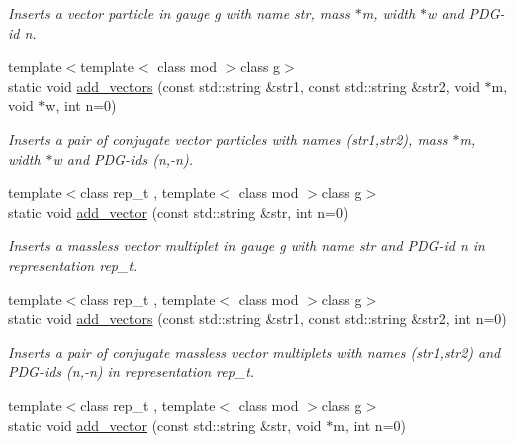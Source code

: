 \begin{DoxyCompactItemize}
\begin{DoxyCompactList}\small\item\em Inserts a vector particle in gauge g with name str, mass $\ast$m, width $\ast$w and P\-D\-G-\/id n. \end{DoxyCompactList}\item 
\hypertarget{a00370_ad261293fcd85128d9d06ad33c84192dc}{{\footnotesize template$<$template$<$ class mod $>$class g$>$ }\\static void \hyperlink{a00370_ad261293fcd85128d9d06ad33c84192dc}{add\-\_\-vectors} (const std\-::string \&str1, const std\-::string \&str2, void $\ast$m, void $\ast$w, int n=0)}\label{a00370_ad261293fcd85128d9d06ad33c84192dc}

\begin{DoxyCompactList}\small\item\em Inserts a pair of conjugate vector particles with names (str1,str2), mass $\ast$m, width $\ast$w and P\-D\-G-\/ids (n,-\/n). \end{DoxyCompactList}\item 
\hypertarget{a00370_a984fc6fde4897b248426d472714305e5}{{\footnotesize template$<$class rep\-\_\-t , template$<$ class mod $>$class g$>$ }\\static void \hyperlink{a00370_a984fc6fde4897b248426d472714305e5}{add\-\_\-vector} (const std\-::string \&str, int n=0)}\label{a00370_a984fc6fde4897b248426d472714305e5}

\begin{DoxyCompactList}\small\item\em Inserts a massless vector multiplet in gauge g with name str and P\-D\-G-\/id n in representation rep\-\_\-t. \end{DoxyCompactList}\item 
\hypertarget{a00370_a86ae07ca89c421c6d143e88a1922a1a3}{{\footnotesize template$<$class rep\-\_\-t , template$<$ class mod $>$class g$>$ }\\static void \hyperlink{a00370_a86ae07ca89c421c6d143e88a1922a1a3}{add\-\_\-vectors} (const std\-::string \&str1, const std\-::string \&str2, int n=0)}\label{a00370_a86ae07ca89c421c6d143e88a1922a1a3}

\begin{DoxyCompactList}\small\item\em Inserts a pair of conjugate massless vector multiplets with names (str1,str2) and P\-D\-G-\/ids (n,-\/n) in representation rep\-\_\-t. \end{DoxyCompactList}\item 
\hypertarget{a00370_ae7334993355db2d1df194f83680d6292}{{\footnotesize template$<$class rep\-\_\-t , template$<$ class mod $>$class g$>$ }\\static void \hyperlink{a00370_ae7334993355db2d1df194f83680d6292}{add\-\_\-vector} (const std\-::string \&str, void $\ast$m, int n=0)}\label{a00370_ae7334993355db2d1df194f83680d6292}


\end{DoxyCompactItemize}
